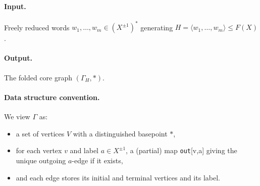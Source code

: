 \documentclass[11pt]{article}
\theoremstyle{definition}
\theoremstyle{plain}
\theoremstyle{remark}
\begin{document}
\paragraph{Input.}
Freely reduced words $w_1,\dots,w_m\in (X^{\pm1})^*$ generating $H=\langle w_1,\dots,w_m\rangle\le F(X)$.

\paragraph{Output.}
The folded core graph $(\Gamma_H,*)$.

\paragraph{Data structure convention.}
We view $\Gamma$ as:
\begin{itemize}[leftmargin=2em]
\item a set of vertices $V$ with a distinguished basepoint $*$,
\item for each vertex $v$ and label $a\in X^{\pm1}$, a (partial) map \texttt{out}[v,a] giving the unique outgoing $a$-edge if it exists,
\item and each edge stores its initial and terminal vertices and its label.
\end{itemize}
\end{document}
